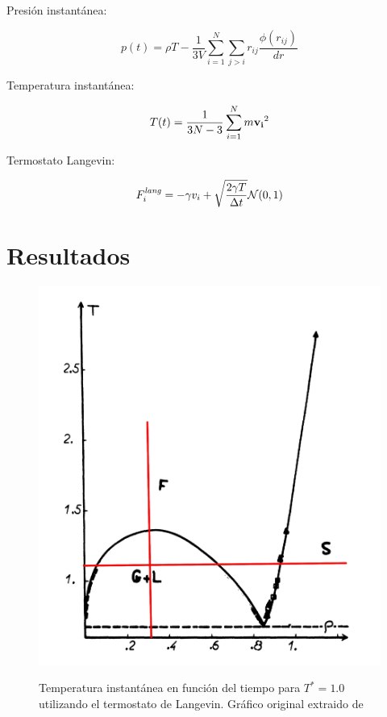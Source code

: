 \documentclass[a4paper,12pt]{article}
\begin{document}
Presión instantánea:

\begin{equation}\label{eq:pres}
p(t) = \rho T  - \frac{1}{3V} \sum_{i=1}^N \sum_{j>i} r_{ij} \frac{\phi(r_{ij})}{dr}
\end{equation}

Temperatura instantánea:

\begin{equation}\label{eq:tempe}
 T(t) = \frac{1}{3N-3} \sum_{i=1}^{N} m {\bf v_i}^2
\end{equation}

Termostato Langevin:

\begin{equation}\label{eq:termo}
 F_i^{\it lang} = - \gamma  v_i + \sqrt{\frac{2\gamma T}{\Delta t}} \mathcal N(0,1)
\end{equation}





\section{Resultados}

\begin{figure}[H]
	\centering
	\includegraphics[scale=0.1]{fases.png} \\
	\caption{Temperatura instantánea en función del tiempo para $T^*=1.0$ utilizando el termostato de Langevin. Gráfico original extraido de \cite{hansenverlet1969}}\label{fig:fases}
\end{figure}
\end{document}
